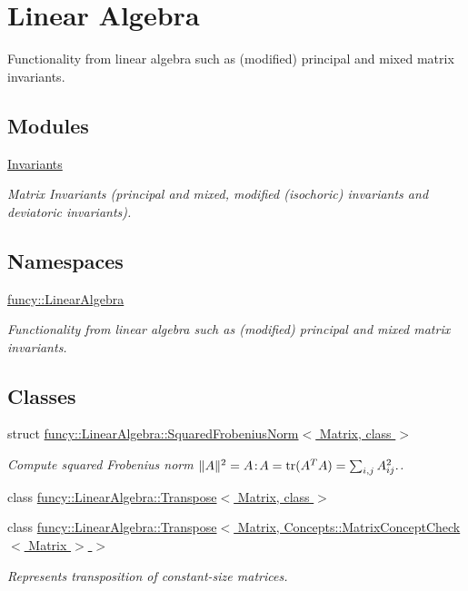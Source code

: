 \hypertarget{group__LinearAlgebraGroup}{\section{Linear Algebra}
\label{group__LinearAlgebraGroup}
}


Functionality from linear algebra such as (modified) principal and mixed matrix invariants.  


\subsection*{Modules}
\begin{DoxyCompactItemize}
\item 
\hyperlink{group__InvariantGroup}{Invariants}
\begin{DoxyCompactList}\small\item\em Matrix Invariants (principal and mixed, modified (isochoric) invariants and deviatoric invariants). \end{DoxyCompactList}\end{DoxyCompactItemize}
\subsection*{Namespaces}
\begin{DoxyCompactItemize}
\item 
\hyperlink{namespacefuncy_1_1LinearAlgebra}{funcy\-::\-Linear\-Algebra}
\begin{DoxyCompactList}\small\item\em Functionality from linear algebra such as (modified) principal and mixed matrix invariants. \end{DoxyCompactList}\end{DoxyCompactItemize}
\subsection*{Classes}
\begin{DoxyCompactItemize}
\item 
struct \hyperlink{structfuncy_1_1LinearAlgebra_1_1SquaredFrobeniusNorm}{funcy\-::\-Linear\-Algebra\-::\-Squared\-Frobenius\-Norm$<$ Matrix, class $>$}
\begin{DoxyCompactList}\small\item\em Compute squared Frobenius norm $ \|A\|^2 = A\negthinspace : \negthinspace A = \mathrm{tr}(A^TA) = \sum_{i,j} A_{ij}^2. $. \end{DoxyCompactList}\item 
class \hyperlink{classfuncy_1_1LinearAlgebra_1_1Transpose}{funcy\-::\-Linear\-Algebra\-::\-Transpose$<$ Matrix, class $>$}
\item 
class \hyperlink{classfuncy_1_1LinearAlgebra_1_1Transpose_3_01Matrix_00_01Concepts_1_1MatrixConceptCheck_3_01Matrix_01_4_01_4}{funcy\-::\-Linear\-Algebra\-::\-Transpose$<$ Matrix, Concepts\-::\-Matrix\-Concept\-Check$<$ Matrix $>$ $>$}
\begin{DoxyCompactList}\small\item\em Represents transposition of constant-\/size matrices. \end{DoxyCompactList}\end{DoxyCompactItemize}
